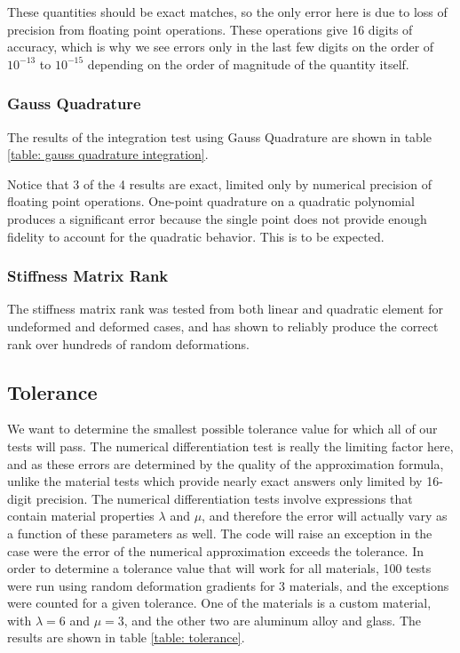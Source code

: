 \documentclass[]{spie}  %
\begin{document}
These quantities should be exact matches, so the only error here is due to loss of precision from floating point operations. These operations give 16 digits of accuracy, which is why we see errors only in the last few digits on the order of $10^{-13}$ to $10^{-15}$ depending on the order of magnitude of the quantity itself.  

\subsubsection{Gauss Quadrature}
The results of the integration test using Gauss Quadrature are shown in table \ref{table: gauss quadrature integration}.


Notice that 3 of the 4 results are exact, limited only by numerical precision of floating point operations. One-point quadrature on a quadratic polynomial produces a significant error because the single point does not provide enough fidelity to account for the quadratic behavior. This is to be expected. 

\subsubsection{Stiffness Matrix Rank}
The stiffness matrix rank was tested from both linear and quadratic element for undeformed and deformed cases, and has shown to reliably produce the correct rank over hundreds of random deformations. 

\subsection{Tolerance}
We want to determine the smallest possible tolerance value for which all of our tests will pass. The numerical differentiation test is really the limiting factor here, and as these errors are determined by the quality of the approximation formula, unlike the material tests which provide nearly exact answers only limited by 16-digit precision. The numerical differentiation tests involve expressions that contain material properties $\lambda$ and $\mu$, and therefore the error will actually vary as a function of these parameters as well. The code will raise an exception in the case were the error of the numerical approximation exceeds the tolerance. In order to determine a tolerance value that will work for all materials, 100 tests were run using random deformation gradients for 3 materials, and the exceptions were counted for a given tolerance. One of the materials is a custom material, with $\lambda = 6$ and $\mu = 3$, and the other two are aluminum alloy and glass. The results are shown in table \ref{table: tolerance}. 
\end{document}
